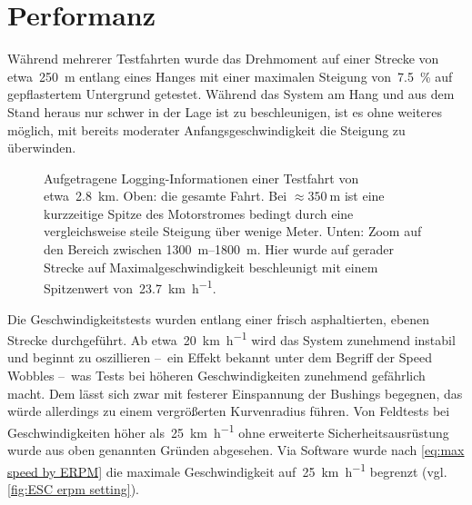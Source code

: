 	\section{Performanz}
		Während mehrerer Testfahrten wurde das Drehmoment auf einer Strecke von etwa~\qty{250}{\metre} entlang eines Hanges mit einer maximalen Steigung von~\qty{7,5}{\percent} auf gepflastertem Untergrund getestet.
		Während das System am Hang und aus dem Stand heraus nur schwer in der Lage ist zu beschleunigen, ist es ohne weiteres möglich, mit bereits moderater Anfangsgeschwindigkeit die Steigung zu überwinden.
		\begin{figure}[h]
			\centering
			
			\caption[Aufgetragene Logging-Informationen einer Testfahrt]{Aufgetragene Logging-Informationen einer Testfahrt von etwa~\qty{2,8}{\kilo\metre}. Oben: die gesamte Fahrt. Bei \(\approx \qty{350}{\metre}\) ist eine kurzzeitige Spitze des Motorstromes bedingt durch eine vergleichsweise steile Steigung über wenige Meter. Unten: Zoom auf den Bereich zwischen \qtyrange{1300}{1800}{\metre}. Hier wurde auf gerader Strecke auf Maximalgeschwindigkeit beschleunigt mit einem Spitzenwert von~\qty{23,7}{\kilo\metre\per\hour}.}%
			\label{fig:esc testdrive plot}
		\end{figure}
		Die Geschwindigkeitstests wurden entlang einer frisch asphaltierten, ebenen Strecke durchgeführt.
		Ab etwa~\qty{20}{\kilo\metre\per\hour} wird das System zunehmend instabil und beginnt zu oszillieren --~ein Effekt bekannt unter dem Begriff der Speed Wobbles --~was Tests bei höheren Geschwindigkeiten zunehmend gefährlich macht.
		Dem lässt sich zwar mit festerer Einspannung der Bushings begegnen, das würde allerdings zu einem vergrößerten Kurvenradius führen.
		Von Feldtests bei Geschwindigkeiten höher als~\qty{25}{\kilo\metre\per\hour} ohne erweiterte Sicherheitsausrüstung wurde aus oben genannten Gründen abgesehen.
		Via Software wurde nach \cref{eq:max speed by ERPM} die maximale Geschwindigkeit auf~\qty{25}{\kilo\metre\per\hour} begrenzt (vgl. \cref{fig:ESC erpm setting}).
		
